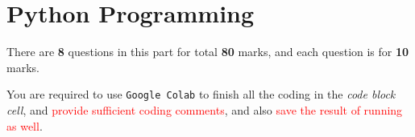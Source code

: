 \documentclass[a4paper]{article}
\begin{document}



    \part{Python Programming}\label{sec:part1}

    There are \textbf{8} questions in this part for total \textbf{80} marks, and each question is for \textbf{10} marks.

    You are required to use \texttt{Google Colab} to
    finish all the coding in the \textit{code block cell},
    and \textcolor{red}{provide sufficient coding comments},
    and also \textcolor{red}{save the result of running as well}.
\end{document}
